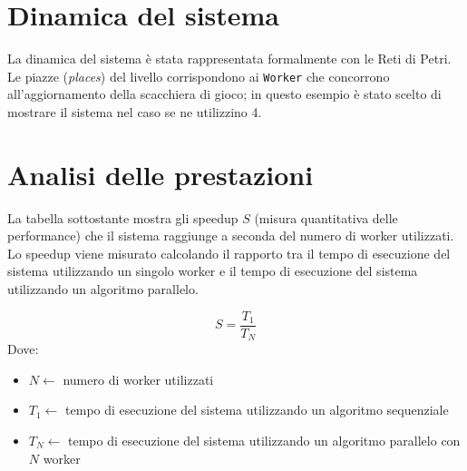 \documentclass[a4paper]{article}
\begin{document}
\section{Dinamica del sistema}\label{dinamica-del-sistema}
La dinamica del sistema è stata rappresentata formalmente con le Reti di Petri. Le piazze (\textit{places}) del livello corrispondono ai \texttt{Worker} che concorrono all'aggiornamento della scacchiera di gioco; in questo esempio è stato scelto di mostrare il sistema nel caso se ne utilizzino 4.

\section{Analisi delle prestazioni}\label{analisi-delle-prestazioni}
La tabella sottostante mostra gli speedup $S$ (misura quantitativa delle performance) che il sistema raggiunge a seconda del numero di worker utilizzati.\\
Lo speedup viene misurato calcolando il rapporto tra il tempo di esecuzione del sistema utilizzando un singolo worker e il tempo di esecuzione del sistema utilizzando un algoritmo parallelo.

\begin{equation}
 S = \frac{T_1}{T_N}
\end{equation}
Dove:
\begin{itemize}
    \item $N \leftarrow$ numero di worker utilizzati
    \item $T_1 \leftarrow$ tempo di esecuzione del sistema utilizzando un algoritmo sequenziale
    \item $T_N \leftarrow$ tempo di esecuzione del sistema utilizzando un algoritmo parallelo con $N$ worker
\end{itemize}
\end{document}
